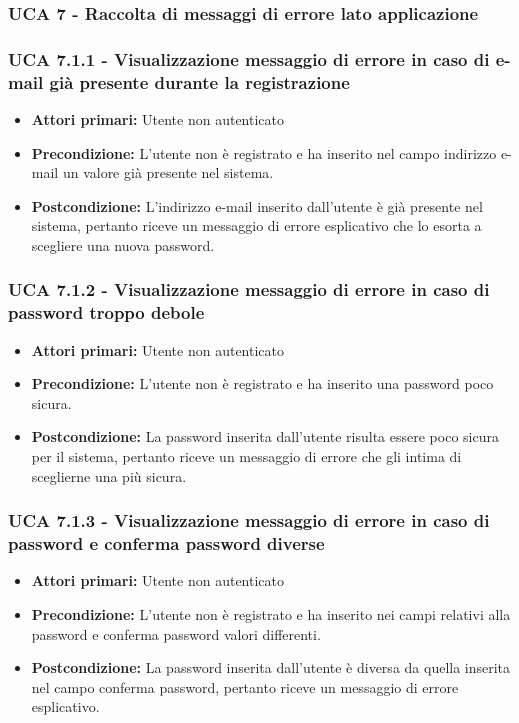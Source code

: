 \newpage
\subsubsection{UCA 7 - Raccolta di messaggi di errore lato applicazione}
\subsubsection{UCA 7.1.1 - Visualizzazione messaggio di errore in caso di e-mail già presente durante la registrazione}%
\begin{itemize}
\item \textbf{Attori primari:} Utente non autenticato
\item \textbf{Precondizione:} L'utente non è registrato e ha inserito nel campo indirizzo e-mail un valore già presente nel sistema.
\item \textbf{Postcondizione:} L'indirizzo e-mail inserito dall'utente è già presente nel sistema, pertanto riceve un messaggio di errore esplicativo che lo esorta a scegliere una nuova password.
\end{itemize}

\subsubsection{UCA 7.1.2 - Visualizzazione messaggio di errore in caso di password troppo debole}%
\begin{itemize}
\item \textbf{Attori primari:} Utente non autenticato
\item \textbf{Precondizione:} L'utente non è registrato e ha inserito una password poco sicura.
\item \textbf{Postcondizione:} La password inserita dall'utente risulta essere poco sicura per il sistema, pertanto riceve un messaggio di errore che gli intima di sceglierne una più sicura.
\end{itemize}


\subsubsection{UCA 7.1.3 - Visualizzazione messaggio di errore in caso di password e conferma password diverse}%
\begin{itemize}
\item \textbf{Attori primari:} Utente non autenticato
\item \textbf{Precondizione:} L'utente non è registrato e ha inserito nei campi relativi alla password e conferma password valori differenti.
\item \textbf{Postcondizione:} La password inserita dall'utente è diversa da quella inserita nel campo conferma password, pertanto riceve un messaggio di errore esplicativo.
\end{itemize}

